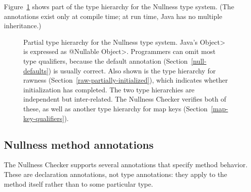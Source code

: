 Figure~\ref{fig:nonnull-hierarchy} shows part of the type hierarchy for the
Nullness type system.
(The annotations exist only at compile time; at run time, Java has no
multiple inheritance.)

\begin{figure}
\caption{Partial type hierarchy for the Nullness type system.
Java's \<Object> is expressed as \<@Nullable Object>.  Programmers can omit
most type qualifiers, because the default annotation
(Section~\ref{null-defaults}) is usually correct.  Also shown is the
type hierarchy for rawness (Section~\ref{raw-partially-initialized}), which
indicates whether
initialization has completed.  The two type hierarchies are independent but
inter-related.  The Nullness Checker verifies both of these, as well as
another type hierarchy for map keys (Section~\ref{map-key-qualifiers}).}
\label{fig:nonnull-hierarchy}
\end{figure}


\subsection{Nullness method annotations\label{nullness-non-qualifiers}}

The Nullness Checker supports several annotations that specify method
behavior.  These are declaration annotations, not type annotations:  they
apply to the method itself rather than to some particular type.

